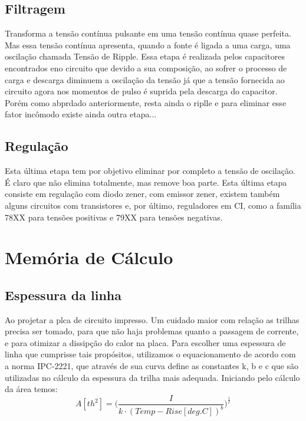 \documentclass[a4paper,12pt,oneside,openany,table,xcdraw]{article}
\begin{document}
\subsection{Filtragem}
Transforma a tensão contínua pulsante em uma tensão contínua quase perfeita. Mas essa tensão contínua apresenta, quando a fonte é ligada a uma carga, uma oscilação chamada Tensão de Ripple. Essa etapa é realizada pelos capacitores encontrados eno circuito que devido a sua composição, ao sofrer o processo de carga e descarga diminuem a oscilação da tensão já que a tensão fornecida ao circuito agora nos momentos de pulso é suprida pela descarga do capacitor. Porém como abprdado anteriormente, resta ainda o riplle e para eliminar esse fator incômodo existe ainda outra etapa...

\subsection{Regulação}
Esta última etapa tem por objetivo eliminar por completo a tensão de oscilação.  É claro que não elimina totalmente, mas remove boa parte. Esta última etapa consiste em regulação com diodo zener, com emissor zener, existem também alguns circuitos com transistores e, por último, reguladores em CI, como a família 78XX para tensões positivas e 79XX para tensões negativas.

\newpage
\section{Memória de Cálculo}

\subsection{Espessura da linha}

Ao projetar a plca de circuito impresso. Um cuidado maior com relação as trilhas precisa ser tomado, para que não haja problemas quanto a passagem de corrente, e para otimizar a dissipção do calor na placa. 
Para escolher uma espessura de linha que cumprisse tais propósitos, utilizamos o equacionamento de acordo com a norma IPC-2221, que através de sua curva define as constantes k, b e c que são utilizadas no cálculo da espessura da trilha mais adequada.
Iniciando pelo cálculo da área temos:
\begin{equation}
A [\mathit{th^{2}}] = \Bigg(\dfrac{I}{k \cdot (Temp-Rise [deg. C])^{b}}\Bigg)^{\frac{1}{c}}
 \end{equation}
 \vspace{0.3cm}
\end{document}
